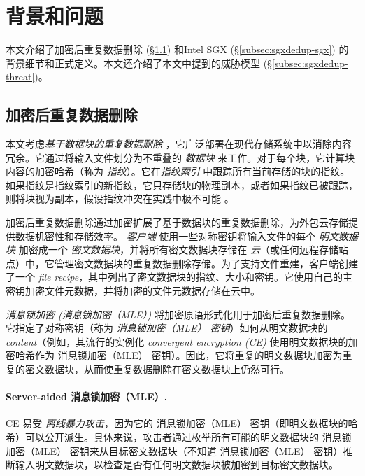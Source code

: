 \section{背景和问题}
\label{sec:sgxdedup-background}

本文介绍了加密后重复数据删除 (\S\ref{subsec:sgxdedup-encrypted-dedup}) 和Intel SGX (\S\ref{subsec:sgxdedup-sgx}) 的背景细节和正式定义。本文还介绍了本文中提到的威胁模型 (\S\ref{subsec:sgxdedup-threat})。

\subsection{加密后重复数据删除}
\label{subsec:sgxdedup-encrypted-dedup}

{\bf } 本文考虑\textit{基于数据块的重复数据删除} \cite{zhu2008avoiding,wallace12,meyer2011deduplication}，它广泛部署在现代存储系统中以消除内容冗余。它通过将输入文件划分为不重叠的 \textit{数据块} 来工作。对于每个块，它计算块内容的加密哈希（称为 \textit{指纹}）。它在\textit{指纹索引} 中跟踪所有当前存储的块的指纹。如果指纹是指纹索引的新指纹，它只存储块的物理副本，或者如果指纹已被跟踪，则将块视为副本，假设指纹冲突在实践中极不可能 \cite{black2006compare}。
   
加密后重复数据删除通过加密扩展了基于数据块的重复数据删除，为外包云存储提供数据机密性和存储效率。 \textit{ 客户端} 使用一些对称密钥将输入文件的每个 \textit{ 明文数据块} 加密成一个 \textit{ 密文数据块}，并将所有密文数据块存储在 \textit{ 云}（或任何远程存储站点）中，它管理密文数据块的重复数据删除存储。为了支持文件重建，客户端创建了一个 \textit{ file recipe}，其中列出了密文数据块的指纹、大小和密钥。它使用自己的主密钥加密文件元数据，并将加密的文件元数据存储在云中。

\textit{ 消息锁加密 (消息锁加密（MLE）)} \cite{bellare2013MLE} 将加密原语形式化用于加密后重复数据删除。它指定了对称密钥（称为 \textit{ 消息锁加密（MLE） 密钥}）如何从明文数据块的 \textit{ content}（例如，其流行的实例化 \textit{ convergent encryption (CE)} \cite{douceur2002reclaiming}使用明文数据块的加密哈希作为 消息锁加密（MLE） 密钥）。因此，它将重复的明文数据块加密为重复的密文数据块，从而使重复数据删除在密文数据块上仍然可行。

\paragraph*{Server-aided 消息锁加密（MLE）.} CE 易受 \textit{ 离线暴力攻击}，因为它的 消息锁加密（MLE） 密钥（即明文数据块的哈希）可以公开派生。具体来说，攻击者通过枚举所有可能的明文数据块的 消息锁加密（MLE） 密钥来从目标密文数据块（不知道 消息锁加密（MLE） 密钥）推断输入明文数据块，以检查是否有任何明文数据块被加密到目标密文数据块。

